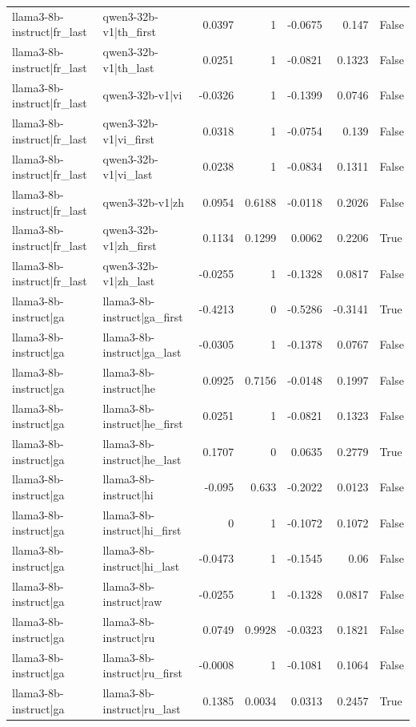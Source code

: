 \begin{table}
\begin{tabular}{l l r r r r l}
llama3-8b-instruct|fr_last & qwen3-32b-v1|th_first & 0.0397 & 1 & -0.0675 & 0.147 & False \\
llama3-8b-instruct|fr_last & qwen3-32b-v1|th_last & 0.0251 & 1 & -0.0821 & 0.1323 & False \\
llama3-8b-instruct|fr_last & qwen3-32b-v1|vi & -0.0326 & 1 & -0.1399 & 0.0746 & False \\
llama3-8b-instruct|fr_last & qwen3-32b-v1|vi_first & 0.0318 & 1 & -0.0754 & 0.139 & False \\
llama3-8b-instruct|fr_last & qwen3-32b-v1|vi_last & 0.0238 & 1 & -0.0834 & 0.1311 & False \\
llama3-8b-instruct|fr_last & qwen3-32b-v1|zh & 0.0954 & 0.6188 & -0.0118 & 0.2026 & False \\
llama3-8b-instruct|fr_last & qwen3-32b-v1|zh_first & 0.1134 & 0.1299 & 0.0062 & 0.2206 & True \\
llama3-8b-instruct|fr_last & qwen3-32b-v1|zh_last & -0.0255 & 1 & -0.1328 & 0.0817 & False \\
llama3-8b-instruct|ga & llama3-8b-instruct|ga_first & -0.4213 & 0 & -0.5286 & -0.3141 & True \\
llama3-8b-instruct|ga & llama3-8b-instruct|ga_last & -0.0305 & 1 & -0.1378 & 0.0767 & False \\
llama3-8b-instruct|ga & llama3-8b-instruct|he & 0.0925 & 0.7156 & -0.0148 & 0.1997 & False \\
llama3-8b-instruct|ga & llama3-8b-instruct|he_first & 0.0251 & 1 & -0.0821 & 0.1323 & False \\
llama3-8b-instruct|ga & llama3-8b-instruct|he_last & 0.1707 & 0 & 0.0635 & 0.2779 & True \\
llama3-8b-instruct|ga & llama3-8b-instruct|hi & -0.095 & 0.633 & -0.2022 & 0.0123 & False \\
llama3-8b-instruct|ga & llama3-8b-instruct|hi_first & 0 & 1 & -0.1072 & 0.1072 & False \\
llama3-8b-instruct|ga & llama3-8b-instruct|hi_last & -0.0473 & 1 & -0.1545 & 0.06 & False \\
llama3-8b-instruct|ga & llama3-8b-instruct|raw & -0.0255 & 1 & -0.1328 & 0.0817 & False \\
llama3-8b-instruct|ga & llama3-8b-instruct|ru & 0.0749 & 0.9928 & -0.0323 & 0.1821 & False \\
llama3-8b-instruct|ga & llama3-8b-instruct|ru_first & -0.0008 & 1 & -0.1081 & 0.1064 & False \\
llama3-8b-instruct|ga & llama3-8b-instruct|ru_last & 0.1385 & 0.0034 & 0.0313 & 0.2457 & True \\

\end{tabular}
\end{table}
